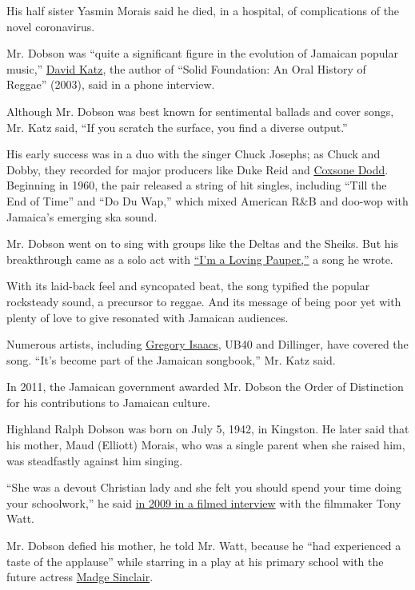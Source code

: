 His half sister Yasmin Morais said he died, in a hospital, of
complications of the novel coronavirus.

Mr. Dobson was ``quite a significant figure in the evolution of Jamaican
popular music,''
\href{https://sites.google.com/site/authordavidkatz/}{David Katz}, the
author of ``Solid Foundation: An Oral History of Reggae'' (2003), said
in a phone interview.

Although Mr. Dobson was best known for sentimental ballads and cover
songs, Mr. Katz said, ``If you scratch the surface, you find a diverse
output.''

His early success was in a duo with the singer Chuck Josephs; as Chuck
and Dobby, they recorded for major producers like Duke Reid and
\href{https://www.nytimes.com/2004/05/06/arts/coxsone-dodd-72-pioneer-of-the-jamaican-pop-music-scene.html}{Coxsone
Dodd}. Beginning in 1960, the pair released a string of hit singles,
including ``Till the End of Time'' and ``Do Du Wap,'' which mixed
American R\&B and doo-wop with Jamaica's emerging ska sound.

Mr. Dobson went on to sing with groups like the Deltas and the Sheiks.
But his breakthrough came as a solo act with
\href{https://www.youtube.com/watch?v=0ZcGDurZrak}{``I'm a Loving
Pauper,''} a song he wrote.

With its laid-back feel and syncopated beat, the song typified the
popular rocksteady sound, a precursor to reggae. And its message of
being poor yet with plenty of love to give resonated with Jamaican
audiences.

Numerous artists, including
\href{https://www.youtube.com/watch?v=wM_m1EJRGjI}{Gregory Isaacs}, UB40
and Dillinger, have covered the song. ``It's become part of the Jamaican
songbook,'' Mr. Katz said.

In 2011, the Jamaican government awarded Mr. Dobson the Order of
Distinction for his contributions to Jamaican culture.

Highland Ralph Dobson was born on July 5, 1942, in Kingston. He later
said that his mother, Maud (Elliott) Morais, who was a single parent
when she raised him, was steadfastly against him singing.

``She was a devout Christian lady and she felt you should spend your
time doing your schoolwork,'' he said
\href{https://www.imdb.com/title/tt1894441/}{in 2009 in a filmed
interview} with the filmmaker Tony Watt.

Mr. Dobson defied his mother, he told Mr. Watt, because he ``had
experienced a taste of the applause'' while starring in a play at his
primary school with the future actress
\href{https://www.nytimes.com/1995/12/23/arts/madge-sinclair-57-tv-and-film-actress.html}{Madge
Sinclair}.

